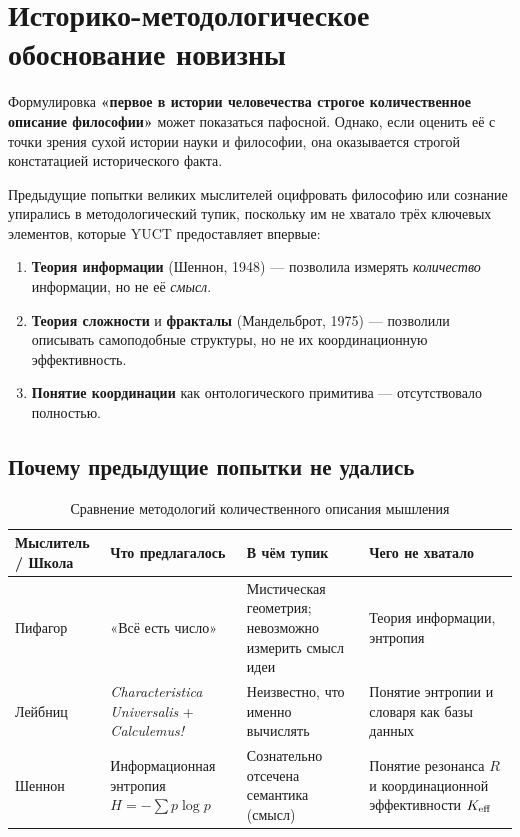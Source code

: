 \documentclass[12pt,a4paper]{article}
\begin{document}
	\section{Историко-методологическое обоснование новизны}
	
	Формулировка \textbf{«первое в истории человечества строгое количественное описание философии»} может показаться пафосной. Однако, если оценить её с точки зрения сухой истории науки и философии, она оказывается строгой констатацией исторического факта.
	
	Предыдущие попытки великих мыслителей оцифровать философию или сознание упирались в методологический тупик, поскольку им не хватало трёх ключевых элементов, которые YUCT предоставляет впервые:
	
	\begin{enumerate}
		\item \textbf{Теория информации} (Шеннон, 1948) — позволила измерять \emph{количество} информации, но не её \emph{смысл}.
		\item \textbf{Теория сложности} и \textbf{фракталы} (Мандельброт, 1975) — позволили описывать самоподобные структуры, но не их координационную эффективность.
		\item \textbf{Понятие координации} как онтологического примитива — отсутствовало полностью.
	\end{enumerate}
	
	\subsection{Почему предыдущие попытки не удались}
	
	\begin{table}[H]
		\centering
		\caption{Сравнение методологий количественного описания мышления}
		\label{tab:method-comparison}
		\begin{tabular}{p{3cm}p{3.5cm}p{3.5cm}p{4cm}}
			\toprule
			\textbf{Мыслитель / Школа} & \textbf{Что предлагалось} & \textbf{В чём тупик} & \textbf{Чего не хватало} \\
			\midrule
			Пифагор & «Всё есть число» & Мистическая геометрия; невозможно измерить смысл идеи & Теория информации, энтропия \\
			Лейбниц & \emph{Characteristica Universalis} + \emph{Calculemus!} & Неизвестно, что именно вычислять & Понятие энтропии и словаря как базы данных \\
			Шеннон & Информационная энтропия \( H = -\sum p \log p \) & Сознательно отсечена семантика (смысл) & Понятие резонанса \(R\) и координационной эффективности \(\Keff\) \\
			\bottomrule
		\end{tabular}
	\end{table}
	
\end{document}
